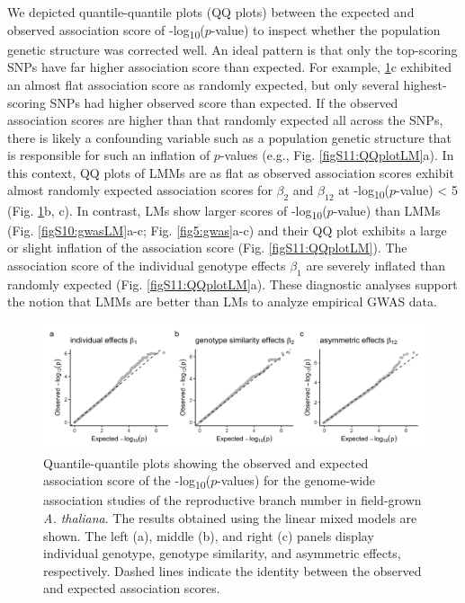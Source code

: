 \documentclass[12pt,]{article}
\begin{document}
We depicted quantile-quantile plots (QQ plots) between the expected and observed association score of -log\textsubscript{10}($p$-value) to inspect whether the population genetic structure was corrected well. An ideal pattern is that only the top-scoring SNPs have far higher association score than expected. For example, \ref{figS9:QQplotLMM}c exhibited an almost flat association score as randomly expected, but only several highest-scoring SNPs had higher observed score than expected. If the observed association scores are higher than that randomly expected all across the SNPs, there is likely a confounding variable such as a population genetic structure that is responsible for such an inflation of $p$-values (e.g., Fig. \ref{figS11:QQplotLM}a). In this context, QQ plots of LMMs are as flat as observed association scores exhibit almost randomly expected association scores for $\beta_2$ and $\beta_{12}$ at -log\textsubscript{10}($p$-value) < 5 (Fig. \ref{figS9:QQplotLMM}b, c). In contrast, LMs show larger scores of -log\textsubscript{10}($p$-value) than LMMs (Fig. \ref{figS10:gwasLM}a-c; Fig. \ref{fig5:gwas}a-c) and their QQ plot exhibits a large or slight inflation of the association score (Fig. \ref{figS11:QQplotLM}). The association score of the individual genotype effects $\beta_1$ are severely inflated than randomly expected (Fig. \ref{figS11:QQplotLM}a). These diagnostic analyses support the notion that LMMs are better than LMs to analyze empirical GWAS data.

\begin{figure}[]
  \includegraphics[width=\linewidth]{QQplotLMM.png}
  \caption{Quantile-quantile plots showing the observed and expected association score of the -log\textsubscript{10}($p$-values) for the genome-wide association studies of the reproductive branch number in field-grown \textit{A. thaliana}. The results obtained using the linear mixed models are shown. The left (a), middle (b), and right (c) panels display individual genotype, genotype similarity, and asymmetric effects, respectively. Dashed lines indicate the identity between the observed and expected association scores.}
  \label{figS9:QQplotLMM}
\end{figure}
\end{document}
